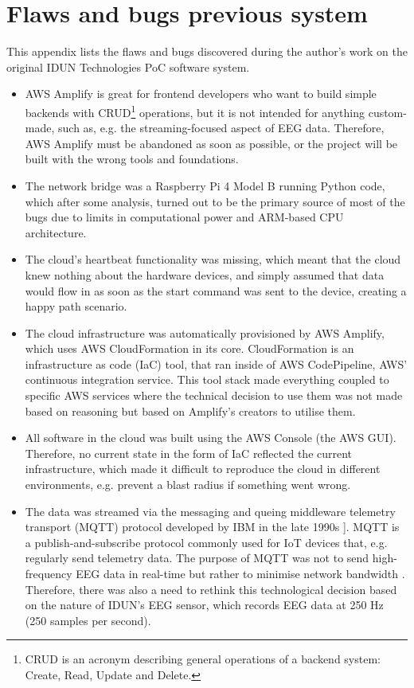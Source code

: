 \chapter{Flaws and bugs previous system}
\label{appendix2-flaws-and-bugs-previous-system}

This appendix lists the flaws and bugs discovered during the author's work on the original IDUN Technologies PoC software system.

\begin{itemize}
  \item AWS Amplify is great for frontend developers who want to build simple backends with CRUD\footnote{CRUD is an acronym describing general operations of a backend system: Create, Read, Update and Delete.} operations, but it is not intended for anything custom-made, such as, e.g. the streaming-focused aspect of EEG data. Therefore, AWS Amplify must be abandoned as soon as possible, or the project will be built with the wrong tools and foundations.
  \item The network bridge was a Raspberry Pi 4 Model B running Python code, which after some analysis, turned out to be the primary source of most of the bugs due to limits in computational power and ARM-based CPU architecture.
  \item The cloud's heartbeat functionality was missing, which meant that the cloud knew nothing about the hardware devices, and simply assumed that data would flow in as soon as the start command was sent to the device, creating a happy path scenario.
  \item The cloud infrastructure was automatically provisioned by AWS Amplify, which uses AWS CloudFormation in its core. CloudFormation is an infrastructure as code (IaC) tool, that ran inside of AWS CodePipeline, AWS' continuous integration service. This tool stack made everything coupled to specific AWS services where the technical decision to use them was not made based on reasoning but based on Amplify's creators to utilise them.
  \item All software in the cloud was built using the AWS Console (the AWS GUI). Therefore, no current state in the form of IaC reflected the current infrastructure, which made it difficult to reproduce the cloud in different environments, e.g. prevent a blast radius if something went wrong.
  \item The data was streamed via the messaging and queing middleware telemetry transport (MQTT) protocol developed by IBM in the late 1990s ]\citep{yuan_getting_2017}. MQTT is a publish-and-subscribe protocol commonly used for IoT devices that, e.g. regularly send telemetry data. The purpose of MQTT was not to send high-frequency EEG data in real-time but rather to minimise network bandwidth \citep{mqtt_use_nodate}. Therefore, there was also a need to rethink this technological decision based on the nature of IDUN's EEG sensor, which records EEG data at 250 Hz (250 samples per second).

\end{itemize}
